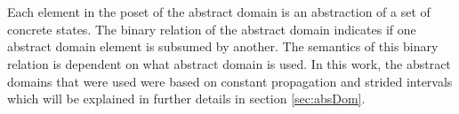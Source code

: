 \documentclass{kththesis}
\begin{document}
\\ \\
Each element in the poset of the abstract domain is an abstraction of a set of concrete states. The binary relation of the abstract domain indicates if one abstract domain element is subsumed by another. The semantics of this binary relation is dependent on what abstract domain is used. In this work, the abstract domains that were used were based on constant propagation and strided intervals which will be explained in further details in section \ref{sec:absDom}.


\clearpage
\end{document}

